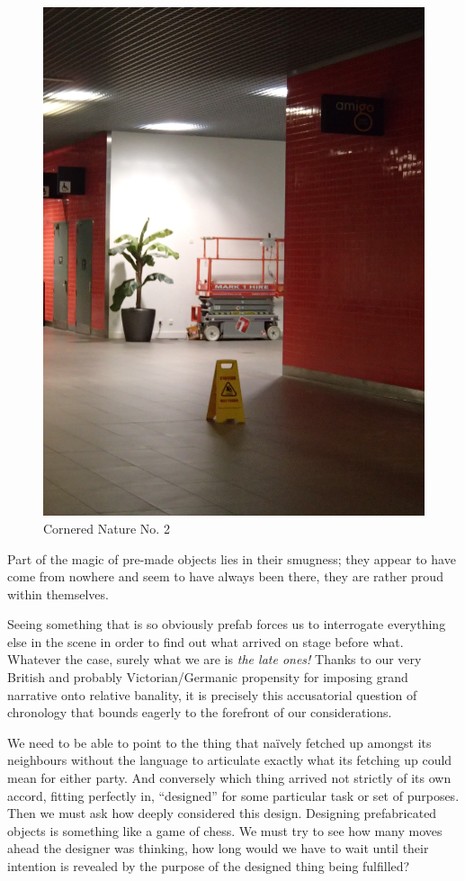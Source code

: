 \documentclass{book}
\begin{document}
\begin{figure}
\centering
\includegraphics[width=\textwidth,angle=-90]{figures/P1050158.JPG}
\caption{Cornered Nature No. 2}
\end{figure}

Part of the magic of pre-made objects lies in their smugness; they appear to
have come from nowhere and seem to have always been there, they are rather
proud within themselves.

Seeing something that is so obviously prefab forces us to interrogate
everything else in the scene in order to find out what arrived on stage before
what.  Whatever the case, surely what we are is \emph{the late ones!} Thanks to
our very British and probably Victorian/Germanic propensity for imposing
grand narrative onto relative banality, it is precisely this accusatorial
question of chronology that bounds eagerly to the forefront of our
considerations.

We need to be able to point to the thing that naïvely fetched up amongst its
neighbours without the language to articulate exactly what its fetching up
could mean for either party. And conversely which thing arrived not strictly of
its own accord, fitting perfectly in, ``designed'' for some particular task or
set of purposes. Then we must ask how deeply considered this design. Designing
prefabricated objects is something like a game of chess.  We must try to see
how many moves ahead the designer was thinking, how long would we have to wait
until their intention is revealed by the purpose of the designed thing being
fulfilled?
\end{document}
